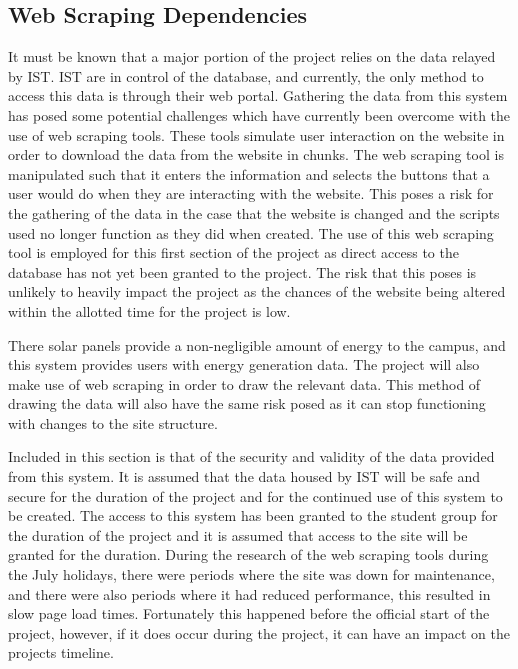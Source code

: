 \documentclass[12pt,onecolumn]{IEEEtran}
\begin{document}
\subsection{Web Scraping Dependencies} \label{sec:WebScrapingDependencies}
It must be known that a major portion of the project relies on the data relayed by IST. IST are in control of the database, and currently, the only method to access this data is through their web portal. Gathering the data from this system has posed some potential challenges which have currently been overcome with the use of web scraping tools. 
These tools simulate user interaction on the website in order to download the data from the website in chunks. The web scraping tool is manipulated such that it enters the information and selects the buttons that a user would do when they are interacting with the website. 
This poses a risk for the gathering of the data in the case that the website is changed and the scripts used no longer function as they did when created. 
The use of this web scraping tool is employed for this first section of the project as direct access to the database has not yet been granted to the project. 
The risk that this poses is unlikely to heavily impact the project as the chances of the website being altered within the allotted time for the project is low.

There solar panels provide a non-negligible amount of energy to the campus, and this system provides users with energy generation data. The project will also make use of web scraping in order to draw the relevant data. This method of drawing the data will also have the same risk posed as it can stop functioning with changes to the site structure.

Included in this section is that of the security and validity of the data provided from this system. It is assumed that the data housed by IST will be safe and secure for the duration of the project and for the continued use of this system to be created. 
The access to this system has been granted to the student group for the duration of the project and it is assumed that access to the site will be granted for the duration.
During the research of the web scraping tools during the July holidays, there were periods where the site was down for maintenance, and there were also periods where it had reduced performance, this resulted in slow page load times. Fortunately this happened before the official start of the project, however, if it does occur during the project, it can have an impact on the projects timeline.
\end{document}
